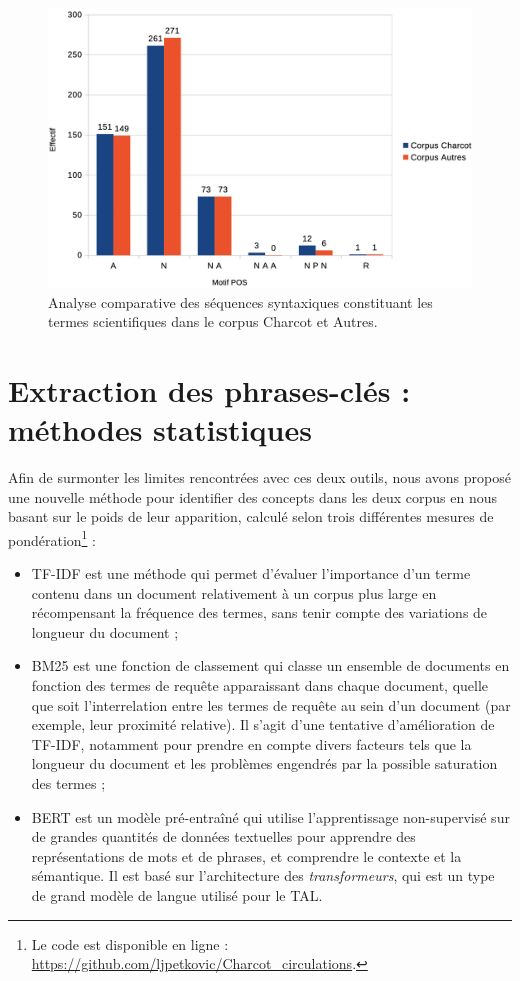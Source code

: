 \begin{figure}[H] %
	\centering
	\includegraphics[width=\linewidth]{img/repartition_motifs_POS.png}
	\caption{Analyse comparative des séquences syntaxiques constituant les termes scientifiques dans le corpus \og{}Charcot\fg{} et \og{}Autres\fg{}.}
	\label{fig:repartition_POS}
\end{figure}

\section{Extraction des phrases-clés : méthodes statistiques}
\label{methodo_stat}
Afin de surmonter les limites rencontrées avec ces deux outils, nous avons proposé une nouvelle méthode pour identifier des concepts dans les deux corpus en nous basant sur le poids de leur apparition, calculé selon trois différentes mesures de pondération\footnote{Le code est disponible en ligne : \url{https://github.com/ljpetkovic/Charcot\_circulations}.} :
\begin{itemize}
\item \textsc{TF-IDF} \citep{robertson1976relevance} est une méthode qui permet d'évaluer l'importance d'un terme contenu dans un document relativement à un corpus plus large en récompensant la fréquence des termes, sans tenir compte des variations de longueur du document ;
\item \textsc{BM25} est une fonction de classement qui classe un ensemble de documents en fonction des termes de requête apparaissant dans chaque document, quelle que soit l'interrelation entre les termes de requête au sein d'un document (par exemple, leur proximité relative). Il s'agit d'une tentative d'amélioration de \textsc{TF-IDF}, notamment pour prendre en compte divers facteurs tels que la longueur du document et les problèmes engendrés par la possible saturation des termes \citep[p.~355]{robertson2009probabilistic} ;
\item \textsc{BERT} \citep{devlin2019} est un modèle pré-entraîné qui utilise l'apprentissage non-supervisé sur de grandes quantités de données textuelles pour apprendre des représentations de mots et de phrases, et comprendre le contexte et la sémantique. Il est basé sur l'architecture des \textit{transformeurs}, qui est un type de grand modèle de langue utilisé pour le \textsc{TAL}.
\end{itemize}

